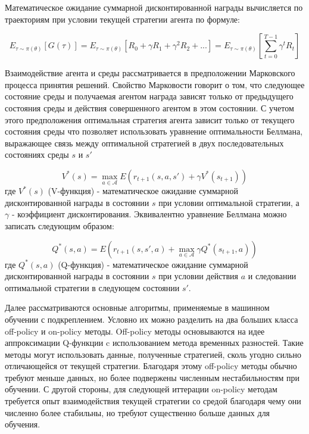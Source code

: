 Математическое ожидание суммарной дисконтированной награды вычисляется по траекториям при условии текущей стратегии агента по формуле: 

\[
E_{\tau \sim \pi(\theta)} [G(\tau)] = E_{\tau \sim \pi(\theta)} [R_0 + \gamma R_{1} + \gamma ^ 2 R_{2} + ...] = E_{\tau \sim \pi(\theta)} [\sum_{t=0}^{T - 1} \gamma ^t R_{t}]
\]

Взаимодействие агента и среды рассматривается в предположении Марковского процесса принятия решений. Свойство Марковости говорит о том, что следующее состояние среды и получаемая агентом награда зависят только от предыдущего состояния среды и действия совершенного агентом в этом состоянии. 
С учетом этого предположения оптимальная стратегия агента зависит только от текущего состояния среды что позволяет использовать уравнение оптимальности Беллмана, выражающее связь между оптимальной стратегией в двух последовательных состояниях среды $s$ и $s'$

\[
	V^*(s) = \max_{a \in \mathcal{A}} E(r_{t + 1}(s, a, s') + \gamma V^*(s_{t + 1}))
\]
где $V^*(s)$ (V-функция) - математическое ожидание суммарной дисконтированной награды в состоянии $s$ при условии оптимальной стратегии, а $\gamma$ - коэффициент дисконтирования. Эквивалентно уравнение Беллмана можно записать следующим образом: 

\[
	Q^*(s, a) = E(r_{t + 1}(s, s', a) + \max_{a \in \mathcal{A}} \gamma Q^*(s_{t + 1}, a))
\]
где $Q^*(s, a)$ (Q-функция) - математическое ожидание суммарной дисконтированной награды в состоянии $s$ при условии действия $a$ и следовании оптимальной стратегии в следующем состоянии $s'$.

Далее рассматриваются основные алгоритмы, применяемые в машинном обучении с подкреплением. Условно их можно разделить на два больших класса off-policy и on-policy методы. Off-policy методы основываются на идее аппроксимации Q-функции c использованием метода временных разностей. Такие методы могут использовать данные, полученные стратегией, сколь угодно сильно отличающейся от текущей стратегии. Благодаря этому off-policy методы обычно требуют меньше данных, но более подвержены численным нестабильностям при обучении. С другой стороны, для следующей иттерации on-policy методам требуется опыт взаимодействия текущей стратегии со средой благодаря чему они численно более стабильны, но требуют существенно больше данных для обучения. 

